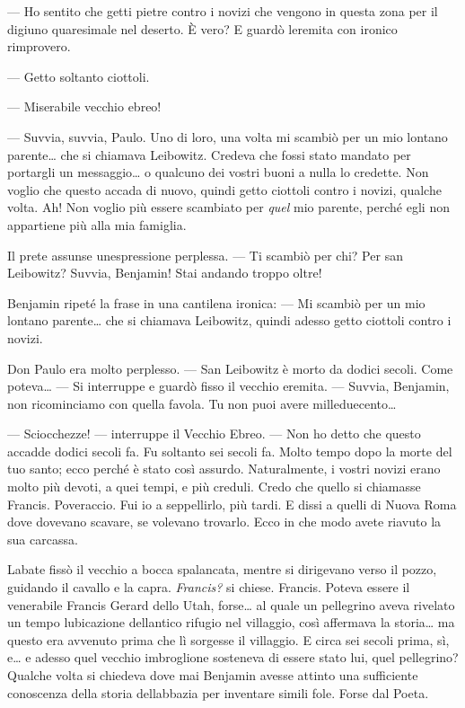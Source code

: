 --- Ho sentito che getti pietre contro i novizi che vengono in questa
zona per il digiuno quaresimale nel deserto. È vero? E guardò
l\textquotesingle eremita con ironico rimprovero.

--- Getto soltanto ciottoli.

--- Miserabile vecchio ebreo!

--- Suvvia, suvvia, Paulo. Uno di loro, una volta mi scambiò per un mio
lontano parente\ldots{} che si chiamava Leibowitz. Credeva che fossi
stato mandato per portargli un messaggio\ldots{} o qualcuno dei vostri
buoni a nulla lo credette. Non voglio che questo accada di nuovo, quindi
getto ciottoli contro i novizi, qualche volta. Ah! Non voglio più essere
scambiato per \emph{quel} mio parente, perché egli non appartiene più
alla mia famiglia.

Il prete assunse un\textquotesingle espressione perplessa. --- Ti
scambiò per chi? Per san Leibowitz? Suvvia, Benjamin! Stai andando
troppo oltre!

Benjamin ripeté la frase in una cantilena ironica: --- Mi scambiò per un
mio lontano parente\ldots{} che si chiamava Leibowitz, quindi adesso
getto ciottoli contro i novizi.

Don Paulo era molto perplesso. --- San Leibowitz è morto da dodici
secoli. Come poteva\ldots{} --- Si interruppe e guardò fisso il vecchio
eremita. --- Suvvia, Benjamin, non ricominciamo con quella favola. Tu
non puoi avere milleduecento\ldots{}

--- Sciocchezze! --- interruppe il Vecchio Ebreo. --- Non ho detto che
questo accadde dodici secoli fa. Fu soltanto sei secoli fa. Molto tempo
dopo la morte del tuo santo; ecco perché è stato così assurdo.
Naturalmente, i vostri novizi erano molto più devoti, a quei tempi, e
più creduli. Credo che quello si chiamasse Francis. Poveraccio. Fui io a
seppellirlo, più tardi. E dissi a quelli di Nuova Roma dove dovevano
scavare, se volevano trovarlo. Ecco in che modo avete riavuto la sua
carcassa.

L\textquotesingle abate fissò il vecchio a bocca spalancata, mentre si
dirigevano verso il pozzo, guidando il cavallo e la capra.
\emph{Francis?} si chiese. Francis. Poteva essere il venerabile Francis
Gerard dello Utah, forse\ldots{} al quale un pellegrino aveva rivelato
un tempo l\textquotesingle ubicazione dell\textquotesingle antico
rifugio nel villaggio, così affermava la storia\ldots{} ma questo era
avvenuto prima che lì sorgesse il villaggio. E circa sei secoli prima,
sì, e\ldots{} e adesso quel vecchio imbroglione sosteneva di essere
stato lui, quel pellegrino? Qualche volta si chiedeva dove mai Benjamin
avesse attinto una sufficiente conoscenza della storia
dell\textquotesingle abbazia per inventare simili fole. Forse dal Poeta.

